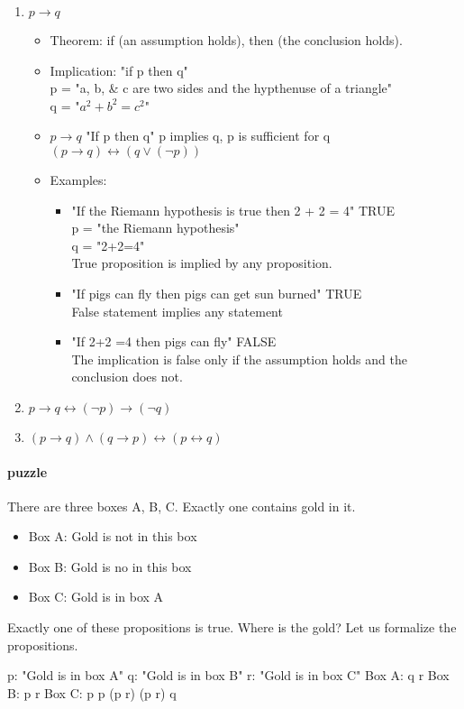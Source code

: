 \documentclass[9pt, letterpaper, oneside]{article}
\begin{document}
\begin{enumerate}
	\item $p \rightarrow q$
	\begin{itemize}
	\item Theorem: if (an assumption holds), then (the conclusion holds).
	\item Implication: "if p then q"\\
		p = "a, b, \& c are two sides and the hypthenuse of a triangle"\\
		q = "$a^2 + b^2 = c^2$"
	\item $p \rightarrow q$ "If p then q" p implies q, p is sufficient for q\\
		$(p \rightarrow q) \leftrightarrow (q \vee (\neg p))$
	\item Examples: 
		\begin{itemize}
			\item "If the Riemann hypothesis is true then 2 + 2 = 4" TRUE\\
			p = "the Riemann hypothesis"\\
			q = "2+2=4"\\
			True proposition is implied by any proposition.
			\item "If pigs can fly then pigs can get sun burned" TRUE\\
			False statement implies any statement
			\item "If 2+2 =4 then pigs can fly" FALSE\\
			The implication is false only if the assumption holds and the conclusion does not.
		\end{itemize}
	\end{itemize}
	\item $p \rightarrow q \leftrightarrow (\neg p) \rightarrow (\neg q)$
	\item $(p \rightarrow q) \wedge (q \rightarrow p) \leftrightarrow (p \leftrightarrow q)$
\end{enumerate}

\paragraph{puzzle}

There are three boxes A, B, C. Exactly one contains gold in it.
\begin{itemize}
	\item Box A: Gold is not in this box
	\item Box B: Gold is no in this box
	\item Box C: Gold is in box A
\end{itemize}
Exactly one of these propositions is true. Where is the gold?
Let us formalize the propositions.
\begin{itemize}
	p:  "Gold is in box A"
	q:  "Gold is in box B"
	r:  "Gold is in box C"
	Box A: q \vee r
	Box B: p \vee r
	Box C: p
	p \rightarrow (p \vee r)
	\neg (p \vee r) \rightarrow q
\end{itemize}
\end{document}
